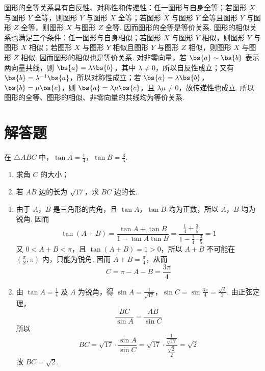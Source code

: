\begin{solution}
图形的全等关系具有自反性、对称性和传递性：任一图形与自身全等；若图形 \(X\) 与图形 \(Y\) 全等，则图形 \(Y\) 与图形 \(X\) 全等；若图形 \(X\) 与图形 \(Y\) 全等且图形 \(Y\) 与图形 \(Z\) 全等，则图形 \(X\) 与图形 \(Z\) 全等. 因而图形的全等是等价关系. 图形的相似关系也满足三个条件：任一图形与自身相似；若图形 \(X\) 与图形 \(Y\) 相似，则图形 \(Y\) 与图形 \(X\) 相似；若图形 \(X\) 与图形 \(Y\) 相似且图形 \(Y\) 与图形 \(Z\) 相似，则图形 \(X\) 与图形 \(Z\) 相似. 因而图形的相似也是等价关系. 对非零向量，若 \(\bs{a}\sim\bs{b}\) 表示两向量共线，则 \(\bs{a}=\lambda\bs{b}\)，其中 \(\lambda\neq0\)，所以自反性成立；又有 \(\bs{b}=\lambda^{-1}\bs{a}\)，所以对称性成立；若 \(\bs{a}=\lambda\bs{b}\)，\(\bs{b}=\mu\bs{c}\)，则 \(\bs{a}=\lambda\mu\bs{c}\)，且 \(\lambda\mu\neq0\)，故传递性也成立. 所以图形的全等、图形的相似、非零向量的共线均为等价关系.
\end{solution}

\section{解答题}

\begin{problem}
在 \(\triangle ABC\) 中，\(\tan A = \frac{1}{4}\)，\(\tan B = \frac{3}{5}\).

\begin{enumerate}
\item 求角 \(C\) 的大小；
\item 若 \(AB\) 边的长为 \(\sqrt{17}\)，求 \(BC\) 边的长.
\end{enumerate}
\end{problem}

\begin{solution}
\begin{enumerate}
\item 由于 \(A\)，\(B\) 是三角形的内角，且 \(\tan A\)，\(\tan B\) 均为正数，所以 \(A\)，\(B\) 均为锐角. 因而
\[
\tan(A+B)=\frac{\tan A+\tan B}{1-\tan A\tan B}
=\frac{\frac{1}{4}+\frac{3}{5}}{1-\frac{1}{4}\cdot\frac{3}{5}}=1
\]
又 \(0<A+B<\pi\)，且 \(\tan(A+B)=1>0\)，所以 \(A+B\) 不可能在 \((\frac{\pi}{2},\pi)\) 内，只能为锐角. 因而 \(A+B=\frac{\pi}{4}\)，从而
\[
C=\pi-A-B=\frac{3\pi}{4}
\]

\item 由 \(\tan A=\frac{1}{4}\) 及 \(A\) 为锐角，得
\(\sin A=\frac{1}{\sqrt{17}}\)，\(\sin C=\sin\frac{3\pi}{4}=\frac{\sqrt{2}}{2}\).
由正弦定理，
\[
\frac{BC}{\sin A}=\frac{AB}{\sin C}
\]
所以
\[
BC=\sqrt{17}\cdot\frac{\sin A}{\sin C}
=\sqrt{17}\cdot\frac{\frac{1}{\sqrt{17}}}{\frac{\sqrt{2}}{2}}=\sqrt{2}
\]
故 \(BC=\sqrt{2}\).
\end{enumerate}
\end{solution}


